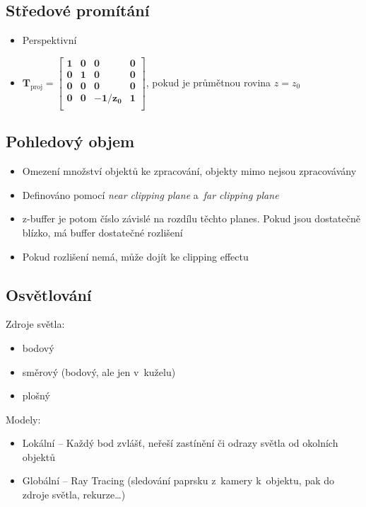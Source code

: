 \subsection{Středové promítání}
\begin{itemize}
    \item Perspektivní
    \item \(\mathbf{T_\mathrm{proj}=\begin{bmatrix}
        1 & 0 & 0 & 0 \\
        0 & 1 & 0 & 0 \\
        0 & 0 & 0 & 0 \\
        0 & 0 & -1/z_0 & 1 \\
    \end{bmatrix}}\), pokud je průmětnou rovina \(z=z_0\)
\end{itemize}

\subsection{Pohledový objem}
\begin{itemize}
    \item Omezení množství objektů ke zpracování, objekty mimo nejsou zpracovávány
    \item Definováno pomocí \textit{near clipping plane} a~\textit{far clipping plane}
    \item z-buffer je potom číslo závislé na rozdílu těchto planes. Pokud jsou dostatečně blízko, má buffer dostatečné rozlišení
    \item Pokud rozlišení nemá, může dojít ke clipping effectu
\end{itemize}

\subsection{Osvětlování}
Zdroje světla:

\begin{itemize}
    \item bodový
    \item směrový (bodový, ale jen v~kuželu)
    \item plošný
\end{itemize}

Modely:

\begin{itemize}
    \item Lokální -- Každý bod zvlášť, neřeší zastínění či odrazy světla od okolních objektů
    \item Globální -- Ray Tracing (sledování paprsku z~kamery k~objektu, pak do zdroje světla, rekurze\dots)
\end{itemize}

